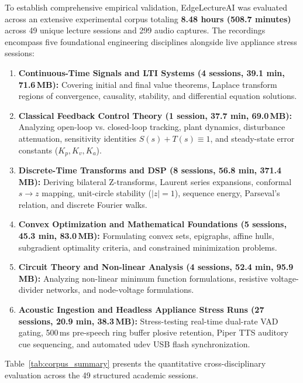 \documentclass[11pt,a4paper,oneside]{report}
\begin{document}
To establish comprehensive empirical validation, EdgeLectureAI was evaluated across an extensive experimental corpus totaling \textbf{8.48 hours (508.7 minutes)} across 49 unique lecture sessions and 299 audio captures. The recordings encompass five foundational engineering disciplines alongside live appliance stress sessions:
\begin{enumerate}[noitemsep]
    \item \textbf{Continuous-Time Signals and LTI Systems (4 sessions, 39.1 min, 71.6\,MB):} Covering initial and final value theorems, Laplace transform regions of convergence, causality, stability, and differential equation solutions.
    \item \textbf{Classical Feedback Control Theory (1 session, 37.7 min, 69.0\,MB):} Analyzing open-loop vs. closed-loop tracking, plant dynamics, disturbance attenuation, sensitivity identities $S(s) + T(s) \equiv 1$, and steady-state error constants ($K_p, K_v, K_a$).
    \item \textbf{Discrete-Time Transforms and DSP (8 sessions, 56.8 min, 371.4\,MB):} Deriving bilateral Z-transforms, Laurent series expansions, conformal $s \to z$ mapping, unit-circle stability ($|z| = 1$), sequence energy, Parseval's relation, and discrete Fourier walks.
    \item \textbf{Convex Optimization and Mathematical Foundations (5 sessions, 45.3 min, 83.0\,MB):} Formulating convex sets, epigraphs, affine hulls, subgradient optimality criteria, and constrained minimization problems.
    \item \textbf{Circuit Theory and Non-linear Analysis (4 sessions, 52.4 min, 95.9\,MB):} Analyzing non-linear minimum function formulations, resistive voltage-divider networks, and node-voltage formulations.
    \item \textbf{Acoustic Ingestion and Headless Appliance Stress Runs (27 sessions, 20.9 min, 38.3\,MB):} Stress-testing real-time dual-rate VAD gating, 500\,ms pre-speech ring buffer plosive retention, Piper TTS auditory cue sequencing, and automated udev USB flash synchronization.
\end{enumerate}

Table~\ref{tab:corpus_summary} presents the quantitative cross-disciplinary evaluation across the 49 structured academic sessions.
\end{document}
